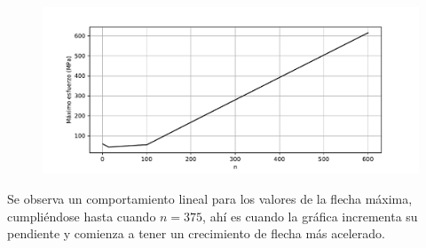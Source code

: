 \documentclass[a4paper,11pt]{report}
\begin{document}
\begin{figure}[H]
\centering
\includegraphics[scale=0.6]{allesf.pdf}
\end{figure}
Se observa un comportamiento lineal para los valores de la flecha máxima, cumpliéndose hasta cuando $n=375$, ahí es cuando la gráfica incrementa su pendiente y comienza a tener un crecimiento de flecha más acelerado.
\end{document}
